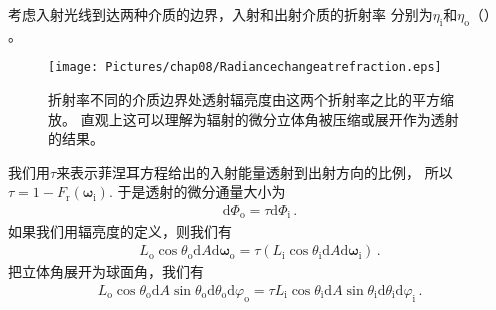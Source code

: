 考虑入射光线到达两种介质的边界，入射和出射介质的折射率
分别为$\eta_{\mathrm{i}}$和$\eta_{\mathrm{o}}$（）
。
\begin{figure}[htbp]
    \centering
    \texttt{[image: Pictures/chap08/Radiancechangeatrefraction.eps]}
    \caption{折射率不同的介质边界处透射辐亮度由这两个折射率之比的平方缩放。
        直观上这可以理解为辐射的微分立体角被压缩或展开作为透射的结果。}
    \label{fig:8.9}
\end{figure}

我们用$\tau$来表示菲涅耳方程给出的入射能量透射到出射方向的比例，
所以$\tau=1-F_{\mathrm{r}}({\bm\omega}_{\mathrm{i}})$.
于是透射的微分通量大小为
\begin{align*}
    \mathrm{d}\varPhi_{\mathrm{o}}=\tau\mathrm{d}\varPhi_{\mathrm{i}}\, .
\end{align*}
如果我们用辐亮度的定义，则我们有
\begin{align*}
    L_{\mathrm{o}}\cos\theta_{\mathrm{o}}\mathrm{d}A\mathrm{d}{\bm\omega}_{\mathrm{o}}=\tau(L_{\mathrm{i}}\cos\theta_{\mathrm{i}}\mathrm{d}A\mathrm{d}{\bm\omega}_{\mathrm{i}})\, .
\end{align*}
把立体角展开为球面角，我们有
\begin{align}
    \label{eq:8.6}
    L_{\mathrm{o}}\cos\theta_{\mathrm{o}}\mathrm{d}A\sin\theta_{\mathrm{o}}\mathrm{d}\theta_{\mathrm{o}}\mathrm{d}\varphi_{\mathrm{o}}=\tau L_{\mathrm{i}}\cos\theta_{\mathrm{i}}\mathrm{d}A\sin\theta_{\mathrm{i}}\mathrm{d}\theta_{\mathrm{i}}\mathrm{d}\varphi_{\mathrm{i}}\, .
\end{align}


